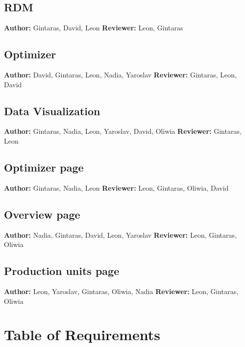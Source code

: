 \section*{RDM}
\textbf{Author:} Gintaras, David, Leon
\textbf{Reviewer:} Leon, Gintaras
\section*{Optimizer}
\textbf{Author:} David, Gintaras, Leon, Nadia, Yaroslav
\textbf{Reviewer:} Gintaras, Leon, David
\section*{Data Visualization}
\textbf{Author:} Gintaras, Nadia, Leon, Yaroslav, David, Oliwia
\textbf{Reviewer:} Gintaras, Leon
\section*{Optimizer page}
\textbf{Author:} Gintaras, Nadia, Leon
\textbf{Reviewer:} Leon, Gintaras, Oliwia, David 
\section*{Overview page}
\textbf{Author:} Nadia, Gintaras, David, Leon, Yaroslav
\textbf{Reviewer:} Leon, Gintaras, Oliwia 
\section*{Production units page}
\textbf{Author:} Leon, Yaroslav, Gintaras, Oliwia, Nadia
\textbf{Reviewer:} Leon, Gintaras, Oliwia 

\chapter{Table of Requirements}\label{appendix:requirements}

